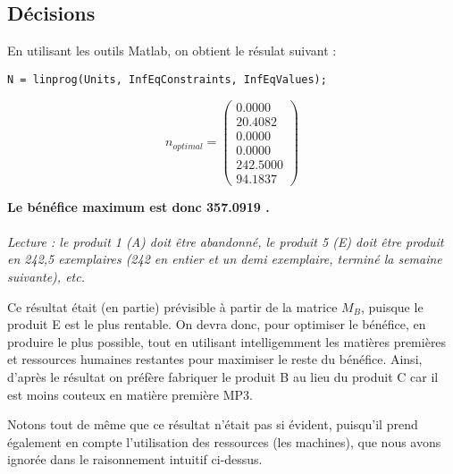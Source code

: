 \subsection{Décisions}

En utilisant les outils Matlab, on obtient le résulat suivant :
\begin{lstlisting}
N = linprog(Units, InfEqConstraints, InfEqValues);
\end{lstlisting}

\[
	n_{optimal} = 
\begin{pmatrix}
    0.0000 \\
   20.4082 \\
    0.0000 \\
    0.0000 \\
  242.5000 \\
   94.1837
\end{pmatrix}
\]

\begin{center}

\textbf{Le bénéfice maximum est donc 357.0919 \textcurrency.\\}
~\\
\textit{Lecture : le produit 1 (A) doit être abandonné, le produit 5 (E) doit
être produit en 242,5 exemplaires (242 en entier et un demi exemplaire, terminé la semaine suivante), etc.}
\end{center}
Ce résultat était (en partie) prévisible à partir de la matrice $M_{B}$, puisque le produit E est le plus rentable. On devra donc, pour optimiser le bénéfice, en produire le plus possible, tout en utilisant intelligemment les matières premières et ressources humaines restantes pour maximiser le reste du bénéfice. Ainsi, d'après le résultat on préfère fabriquer le produit B au lieu du produit C car il est moins couteux en matière première MP3.

Notons tout de même que ce résultat n'était pas si évident, puisqu'il prend également en compte l'utilisation des ressources (les machines), que nous avons ignorée dans le raisonnement \og intuitif \fg ci-dessus.

